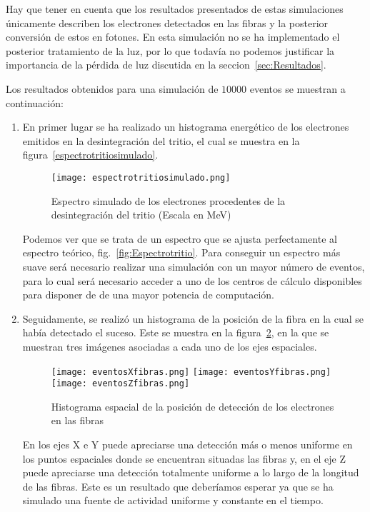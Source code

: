 Hay que tener en cuenta que los resultados presentados de estas simulaciones únicamente describen los electrones detectados en las fibras y la posterior conversión de estos en fotones. En esta simulación no se ha implementado el posterior tratamiento de la luz, por lo que todavía no podemos justificar la importancia de la pérdida de luz discutida en la seccion~\ref{sec:Resultados}.

Los resultados obtenidos para una simulación de $10000$ eventos se muestran a continuación:
\begin{enumerate}
\item{} En primer lugar se ha realizado un histograma energético de los electrones emitidos en la desintegración del tritio, el cual se muestra en la figura~\ref{espectrotritiosimulado}.

\begin{figure}[hbtp]
\centering
\texttt{[image: espectrotritiosimulado.png]}
\caption{Espectro simulado de los electrones procedentes de la desintegración del tritio (Escala en MeV)\label{espectrotritiosimuladonewpage}}
\end{figure}

Podemos ver que se trata de un espectro que se ajusta perfectamente al espectro teórico, fig.~\ref{fig:Espectrotritio}. Para conseguir un espectro más suave será necesario realizar una simulación con un mayor número de eventos, para lo cual será necesario acceder a uno de los centros  de cálculo disponibles para disponer de de una mayor potencia de computación.

\item{} Seguidamente, se realizó un histograma de la posición de la fibra en la cual se había detectado el suceso. Este se muestra en la  figura~\ref{espectroespacial}, en la que se muestran tres imágenes asociadas a cada uno de los ejes espaciales.

\begin{figure}[htb]
\centering
{
\texttt{[image: eventosXfibras.png]} 
}
{
\texttt{[image: eventosYfibras.png]} 
}
{
\texttt{[image: eventosZfibras.png]} 
}
\caption{Histograma espacial de la posición de detección de los electrones en las fibras\label{espectroespacial}}
\end{figure}

En los ejes X e Y puede apreciarse una detección más o menos uniforme en los puntos espaciales donde se encuentran situadas las fibras y, en el eje Z puede apreciarse una detección totalmente uniforme a lo largo de la longitud de las fibras. Este es un resultado que deberíamos esperar ya que se ha simulado una fuente de actividad uniforme y constante en el tiempo.


\end{enumerate}
